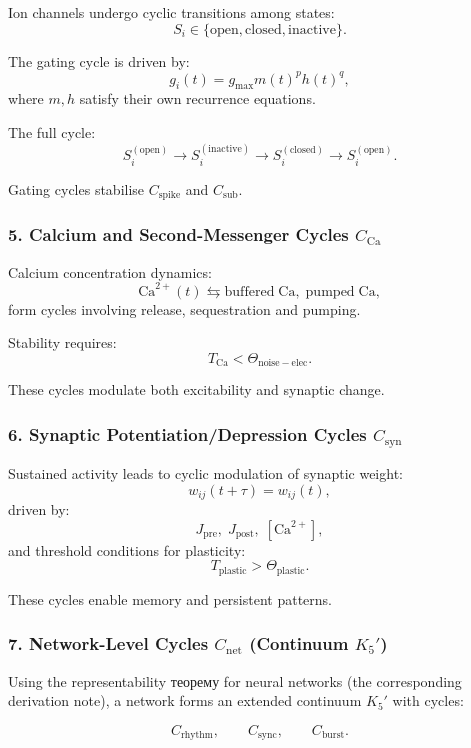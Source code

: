 Ion channels undergo cyclic transitions among states:
\[
  S_i \in \{\mathrm{open}, \mathrm{closed}, \mathrm{inactive}\}.
\]

The gating cycle is driven by:
\[
  g_i(t) = g_{\mathrm{max}} m(t)^p h(t)^q,
\]
where $m,h$ satisfy their own recurrence equations.

The full cycle:
\[
  S_i^{(\mathrm{open})}
  \to
  S_i^{(\mathrm{inactive})}
  \to
  S_i^{(\mathrm{closed})}
  \to
  S_i^{(\mathrm{open})}.
\]

Gating cycles stabilise $C_{\mathrm{spike}}$ and $C_{\mathrm{sub}}$.

\subsubsection{5. Calcium and Second-Messenger Cycles $C_{\mathrm{Ca}}$}

Calcium concentration dynamics:
\[
  \mathrm{Ca}^{2+}(t)
  \leftrightarrows
  \mathrm{buffered\; Ca},\;
  \mathrm{pumped\; Ca},
\]
form cycles involving release, sequestration and pumping.

Stability requires:
\[
  T_{\mathrm{Ca}} < \Theta_{\mathrm{noise-elec}}.
\]

These cycles modulate both excitability and synaptic change.

\subsubsection{6. Synaptic Potentiation/Depression Cycles $C_{\mathrm{syn}}$}

Sustained activity leads to cyclic modulation of synaptic weight:
\[
  w_{ij}(t+\tau) = w_{ij}(t),
\]
driven by:
\[
  J_{\mathrm{pre}},\; J_{\mathrm{post}},\; [\mathrm{Ca}^{2+}],
\]
and threshold conditions for plasticity:
\[
  T_{\mathrm{plastic}} > \Theta_{\mathrm{plastic}}.
\]

These cycles enable memory and persistent patterns.

\subsubsection{7. Network-Level Cycles $C_{\mathrm{net}}$ (Continuum $K_5'$)}

Using the representability теорему for neural networks (the corresponding derivation note),
a network forms an extended continuum $K_5'$ with cycles:

\[
  C_{\mathrm{rhythm}},
  \qquad
  C_{\mathrm{sync}},
  \qquad
  C_{\mathrm{burst}}.
\]

